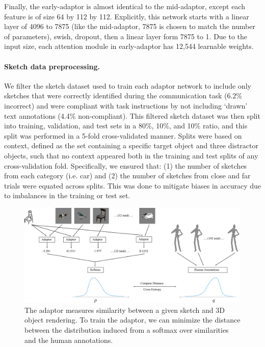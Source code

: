 \documentclass[9pt,twocolumn,twoside]{pnas-new}
\begin{document}
{Finally, the early-adaptor is almost identical to the mid-adaptor, except each feature is of size 64 by 112 by 112. Explicitly, this network starts with a linear layer of 4096 to 7875 (like the mid-adaptor, 7875 is chosen to match the number of parameters), swish, dropout, then a linear layer form 7875 to 1. Due to the input size, each attention module in early-adaptor has 12,544 learnable weights.

\paragraph{Sketch data preprocessing.} We filter the sketch dataset used to train each adaptor network to include only sketches that were correctly identified during the communication task (6.2\% incorrect) and were compliant with task instructions by not including `drawn' text annotations (4.4\% non-compliant). This filtered sketch dataset was then split into training, validation, and test sets in a 80\%, 10\%, and 10\% ratio, and this split was performed in a 5-fold cross-validated manner. Splits were based on context, defined as the set containing a specific target object and three distractor objects, such that no context appeared both in the training and test splits of any cross-validation fold. Specifically, we ensured that: (1) the number of sketches from each category (i.e. car) and  (2) the number of sketches from close and far trials were equated across splits. This was done to mitigate biases in accuracy due to imbalances in the training or test set.


\begin{figure}[h!]
\centering
\includegraphics[width=0.95\columnwidth]{figures/adaptor_algorithm.pdf}
\caption{The adaptor measures similarity between a given sketch and 3D object rendering. To train the adaptor, we can minimize the distance between the distribution induced from a softmax over similarities and the human annotations.}
\label{fig:adaptor_training}
\end{figure}

}
\end{document}
